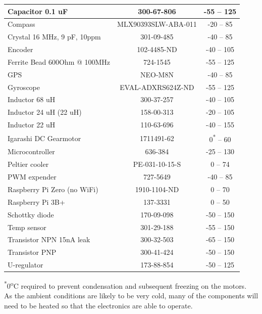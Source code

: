 {\begin{center}
\begin{tabular}{ | l | c | c |}
    \hline
    Capacitor 0.1 uF & 300-67-806 & -55 – 125 \\ 
    \hline
    Compass & MLX90393SLW-ABA-011 & -20 – 85 \\ 
    \hline
    Crystal 16 MHz, 9 pF, 10ppm & 301-09-485 & -40 – 85 \\
    \hline
    Encoder & 102-4485-ND & -40 – 105 \\
    \hline
    Ferrite Bead 600Ohm @ 100MHz & 724-1545 & -55 – 125 \\
    \hline
    GPS & NEO-M8N & -40 – 85\\
    \hline
    Gyroscope & EVAL-ADXRS624Z-ND & -55 – 125 \\
    \hline
    Inductor 68 uH & 300-37-257 & -40 – 105 \\
    \hline
    Inductor 24 uH (22 uH) & 158-00-313 & -20 – 105 \\
    \hline
    Inductor 22 uH & 110-63-696 & -40 – 155\\
    \hline
    Igarashi DC Gearmotor & 1711491-62 & 0\textsuperscript{*} – 60 \\  
    \hline
    Microcontroller & 636-384 & -25 – 130 \\
    \hline
    Peltier cooler & PE-031-10-15-S & 0 – 74 \\
    \hline
    PWM expender & 727-5649 & -40 – 85 \\
    \hline
    Raspberry Pi Zero (no WiFi) & 1910-1104-ND & 0 – 70 \\
    \hline
    Raspberry Pi 3B+ & 137-3331 & 0 – 50 \\
    \hline
    Schottky diode & 170-09-098 & -50 – 150 \\
    \hline
    Temp sensor & 301-29-188 & -55 – 150 \\
    \hline
    Transistor NPN 15nA leak & 300-32-503 & -65 – 150 \\
    \hline
    Transistor PNP & 300-41-424 & -50 – 150 \\
    \hline
    U-regulator & 173-88-854 & -50 – 125\\
    \hline
\end{tabular}
\end{center}}
\textsuperscript{*}0\textsuperscript{o}C required to prevent condensation and subsequent freezing on the motors.\\

As the ambient conditions are likely to be very cold, many of the components will need to be heated so that the electronics are able to operate.\\

